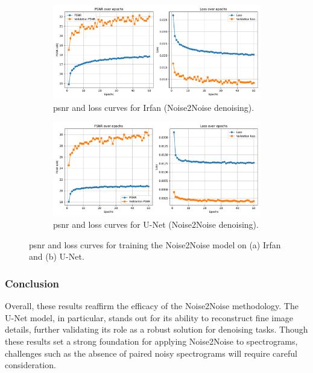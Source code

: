 \begin{figure}[p]
    \centering
    \begin{subfigure}{\textwidth}
        \centering
        \includegraphics[width=\textwidth]{img/ch6/n2n_imagenet/psnr_loss_irfan.pdf}
        \caption{\acrshort{psnr} and loss curves for Irfan (Noise2Noise denoising).}
    \end{subfigure}
    
    \vspace{1cm}
    
    \begin{subfigure}{\textwidth}
        \centering
        \includegraphics[width=\textwidth]{img/ch6/n2n_imagenet/psnr_loss_unet.pdf}
        \caption{\acrshort{psnr} and loss curves for U-Net (Noise2Noise denoising).}
    \end{subfigure}
    \caption{\acrshort{psnr} and loss curves for training the Noise2Noise model on (a) Irfan and (b) U-Net.}
    \label{fig:n2n-denoising-imagenet-curves}
\end{figure}


\subsubsection{Conclusion}
Overall, these results reaffirm the efficacy of the Noise2Noise methodology. The U-Net model, in particular, stands out for its ability to reconstruct fine image details, further validating its role as a robust solution for denoising tasks. Though these results set a strong foundation for applying Noise2Noise to spectrograms, challenges such as the absence of paired noisy spectrograms will require careful consideration.

